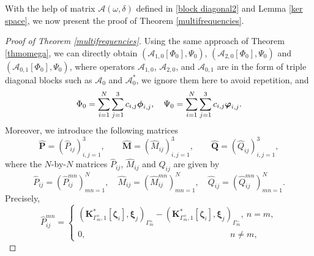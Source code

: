 \documentclass[10pt,reqno,oneside]{amsart}%
\theoremstyle{definition}
\theoremstyle{remark}
\numberwithin{equation}{section}
\numberwithin{equation}{section}
\begin{document}
With the help of matrix $\mathcal{A}(\omega,\delta)$ defined in \eqref{block diagonal2} and Lemma \ref{ker space}, we now present the proof of Theorem \ref{multifrequencies}.
\begin{proof}[Proof of Theorem \ref{multifrequencies}]
	Using the same approach of Theorem \ref{thmomega}, we can directly obtain $(\mathcal{A}_{1,0}[\Phi_0],\Psi_0)$, $(\mathcal{A}_{2,0}[\Phi_0],\Psi_0)$ and $(\mathcal{A}_{0,1}[\Phi_0],\Psi_0)$, where operators $\mathcal{A}_{1,0}$, $\mathcal{A}_{2,0}$, and $\mathcal{A}_{0,1}$ are in the form of triple diagonal blocks such as $\mathcal{A}_0$ and $\mathcal{A}^{*}_0$, we ignore them here to avoid repetition, and
	\begin{equation}
		\Phi_0=\sum_{i=1}^{N}\sum_{j=1}^3 c_{i,j}\boldsymbol{\phi}_{i,j},\quad \Psi_0=\sum_{i=1}^{N}\sum_{j=1}^3 c_{i,j}\boldsymbol{\varphi}_{i,j}.	\notag
	\end{equation}
Moreover, we introduce the following matrices
	\begin{equation}\label{matriceshat1}
		\hat{\mathbf{P}}=(\hat{P}_{ij})_{i,j=1}^{3},\quad\quad \hat{\mathbf{M}}=(\hat{M}_{ij})_{i,j=1}^{3},\quad\quad \hat{\mathbf{Q}}=(\hat{Q}_{ij})_{i,j=1}^{3}, %
	\end{equation}
	where the $N$-by-$N$ matrices $\hat{P}_{ij}$, $\hat{M}_{ij}$ and $\hat{Q}_{ij}$ are given by
	\begin{equation}\label{matriceshat2}
		\hat{P}_{ij}=(\hat{P}_{ij}^{mn})_{mn=1}^{N},\quad\hat{M}_{ij}=(\hat{M}_{ij}^{mn})_{mn=1}^{N},\quad\hat{Q}_{ij}=(\hat{Q}_{ij}^{mn})_{mn=1}^{N}.%
	\end{equation}
	Precisely,
	\begin{equation}\label{matriceshat3}
		\hat{P}_{ij}^{mn}=
		\begin{cases}
			\left(\mathbf{K}_{\Gamma_{m}^{+},1}^{*}[\boldsymbol{\zeta}_i],\boldsymbol{\xi}_{j}\right)_{\Gamma_{m}^{+}}-
			\left(\mathbf{K}_{\Gamma_{m}^{+},1}^{*}[\boldsymbol{\zeta}_i],\boldsymbol{\xi}_{j}\right)_{\Gamma_{m}^{-}},\ n=m,\\
			0,\quad\quad \quad\quad \quad\quad \quad\quad \quad\quad \quad\quad \quad\quad \quad\quad \ \ \ \, n\neq m ,\nonumber

\end{cases}
\end{equation}
\end{proof}
\end{document}
